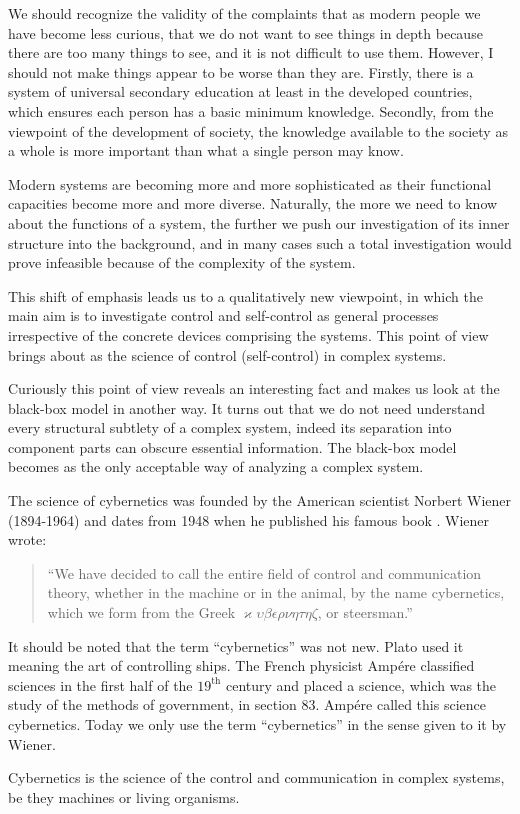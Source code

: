 We should recognize the validity of the complaints that as modern
people we have become less curious, that we do not want to see things
in depth because there are too many things to see, and it is not difficult
to use them. However, I should not make things appear to be worse
than they are. Firstly, there is a system of universal secondary education
at least in the developed countries, which ensures each person has
a basic minimum knowledge. Secondly, from the viewpoint of the
development of society, the knowledge available to the society
as a whole is more important than what a single person may
know.

 Modern systems are becoming more
and more sophisticated as their functional capacities become more and
more diverse. Naturally, the more we need to know about the functions
of a system, the further we push our investigation of its inner structure
into the background, and in many cases such a total investigation would
prove infeasible because of the complexity of the system.

This shift of emphasis leads us to a qualitatively new viewpoint, in
which the main aim is to investigate control and self-control as general
processes irrespective of the concrete devices comprising the systems.
This point of view brings about  as the science of control
(self-control) in complex systems.

Curiously this point of view reveals an interesting fact and makes us
look at the black-box model in another way. It turns out that we do not
need understand every structural subtlety of a complex system, indeed
its separation into component parts can obscure essential information.
The black-box model becomes  as the only acceptable way
of analyzing a complex system.

 The science of cybernetics was founded by the American scientist Norbert Wiener (1894-1964) and dates from 1948
when he published his famous book . Wiener wrote:
\begin{quote}
``We have decided to call the entire field of control and
communication theory, whether in the machine or in the animal, by the
name cybernetics, which we form from the Greek $\varkappa \upsilon \beta \epsilon \rho \nu  \eta \tau \eta \zeta$, or steersman.''\\[-10pt]
\end{quote}
It should be noted that the term ``cybernetics'' was not new. Plato
used it meaning the art of controlling ships. The French physicist
Amp\'ere classified sciences in the first half of the $19^{\text{th}}$ century and placed a science, which was the study of the methods of government, in section
83. Amp\'ere called this science cybernetics. Today we only use the term
``cybernetics'' in the sense given to it by Wiener. 
\begin{mybox}{}
Cybernetics is the science of the control and communication in complex systems, be they machines or living organisms.
\end{mybox}

